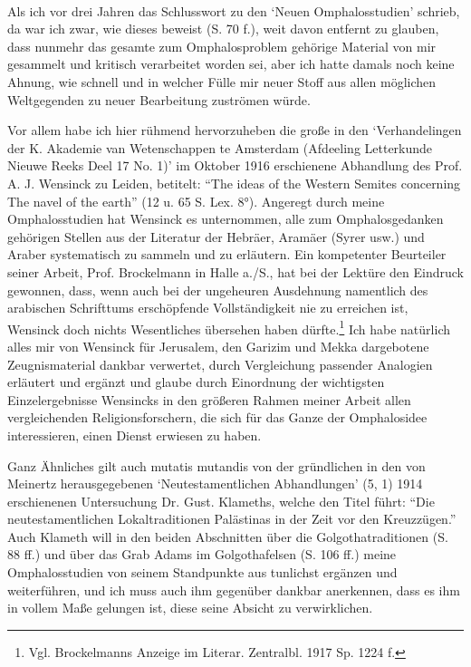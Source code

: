 \documentclass[a4paper, 11pt, oneside]{article}
\begin{document}
\paragraph{}
Als ich vor drei Jahren das Schlusswort zu den `Neuen Omphalosstudien' schrieb, da war ich zwar, wie dieses beweist (S. 70 f.), weit davon entfernt zu glauben, dass nunmehr das gesamte zum Omphalosproblem gehörige Material von mir gesammelt und kritisch verarbeitet worden sei, aber ich hatte damals noch keine Ahnung, wie schnell und in welcher Fülle mir neuer Stoff aus allen möglichen Weltgegenden zu neuer Bearbeitung zuströmen würde.

Vor allem habe ich hier rühmend hervorzuheben die große in den `Verhandelingen der K. Akademie van Wetenschappen te Amsterdam (Afdeeling Letterkunde Nieuwe Reeks Deel 17 No. 1)' im Oktober 1916 erschienene Abhandlung des Prof. A. J. Wensinck zu Leiden, betitelt: "`The ideas of the Western Semites concerning The navel of the earth"' (12 u. 65 S. Lex. 8°). Angeregt durch meine Omphalosstudien hat Wensinck es unternommen, alle zum Omphalosgedanken gehörigen Stellen aus der Literatur der Hebräer, Aramäer (Syrer usw.) und Araber systematisch zu sammeln und zu erläutern. Ein kompetenter Beurteiler seiner Arbeit, Prof. Brockelmann in Halle a./S., hat bei der Lektüre den Eindruck gewonnen, dass, wenn auch bei der ungeheuren Ausdehnung namentlich des arabischen Schrifttums erschöpfende Vollständigkeit nie zu erreichen ist, Wensinck doch nichts Wesentliches übersehen haben dürfte.\footnote{Vgl. Brockelmanns Anzeige im Literar. Zentralbl. 1917 Sp. 1224 f.} Ich habe natürlich alles mir von Wensinck für Jerusalem, den Garizim und Mekka dargebotene Zeugnismaterial dankbar verwertet, durch Vergleichung passender Analogien erläutert und ergänzt und glaube durch Einordnung der wichtigsten Einzelergebnisse Wensincks in den größeren Rahmen meiner Arbeit allen vergleichenden Religionsforschern, die sich für das Ganze der Omphalosidee interessieren, einen Dienst erwiesen zu haben.

Ganz Ähnliches gilt auch mutatis mutandis von der gründlichen in den von Meinertz herausgegebenen `Neutestamentlichen Abhandlungen' (5, 1) 1914 erschienenen Untersuchung Dr. Gust. Klameths, welche den Titel führt: "`Die neutestamentlichen Lokaltraditionen Palästinas in der Zeit vor den Kreuzzügen."' Auch Klameth will in den beiden Abschnitten über die Golgothatraditionen (S. 88 ff.) und über das Grab Adams im Golgothafelsen (S. 106 ff.) meine Omphalosstudien von seinem Standpunkte aus tunlichst ergänzen und weiterführen, und ich muss auch ihm gegenüber dankbar anerkennen, dass es ihm in vollem Maße gelungen ist, diese seine Absicht zu verwirklichen.
\end{document}

